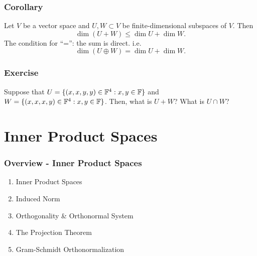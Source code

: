\documentclass[12pt, t]{beamer}
\newcommand{\nullspace}{~\\[15pt]}
\begin{document}
\begin{frame}
    \frametitle{Corollary}
    Let $V$ be a vector space and $U,W\subset V$ be finite-dimensional subspaces of $V$. Then
    \[\dim(U+W)\leq\dim U+\dim W.\]
    The condition for ``='': the sum is direct. i.e.
    \[\dim(U\oplus W)=\dim U+\dim W.\]
\end{frame}

\begin{frame}
    \frametitle{Exercise}
    Suppose that $U=\{(x,x,y,y)\in\mathbb{F}^4:x,y\in\mathbb{F}\}$ and $W=\{(x,x,x,y)\in\mathbb{F}^4:x,y\in\mathbb{F}\}$. Then, what is $U+W$? What is $U\cap W$?
\end{frame}

\section{Inner Product Spaces}
\begin{frame}
    \frametitle{Overview - Inner Product Spaces}
    \begin{enumerate}
        \item Inner Product Spaces
        \item Induced Norm
        \item Orthogonality \& Orthonormal System
        \item The Projection Theorem
        \item Gram-Schmidt Orthonormalization
    \end{enumerate}

\end{frame}
\end{document}
